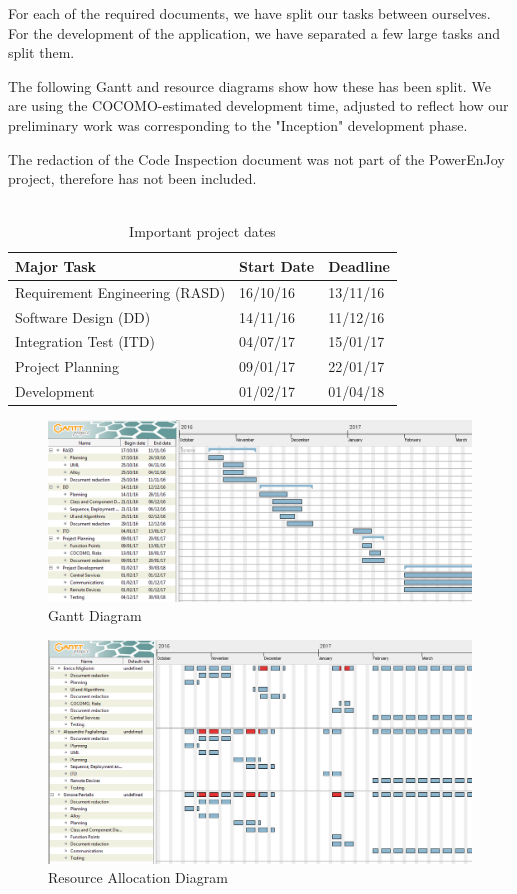 For each of the required documents, we have split our tasks between ourselves. For the development of the application, we have separated a few large tasks and split them.

The following Gantt and resource diagrams show how these has been split. We are using the COCOMO-estimated development time, adjusted to reflect how our preliminary work was corresponding to the "Inception" development phase.

The redaction of the Code Inspection document was not part of the PowerEnJoy project, therefore has not been included.
\\
\\
\begin{table}[h]
\centering
\begin{tabular}{l|l|l}	
	\textbf{Major Task} & \textbf{Start Date} & \textbf{Deadline} \\ \hline
	Requirement Engineering (RASD) & 16/10/16 & 13/11/16 \\ \hline
	Software Design (DD) & 14/11/16 & 11/12/16 \\ \hline
	Integration Test (ITD) & 04/07/17 & 15/01/17 \\ \hline
	Project Planning & 09/01/17 & 22/01/17 \\ \hline
	Development & 01/02/17 & 01/04/18 \\	
\end{tabular}
\caption{Important project dates}
\end{table}

\begin{figure}[h]
	\centering
	\includegraphics[width=\textwidth]{Images/GANTT}
	\caption{Gantt Diagram}
\end{figure}

\begin{figure}[h]
	\centering
	\includegraphics[width=\textwidth]{Images/RESOURCE}
	\caption{Resource Allocation Diagram}
\end{figure}